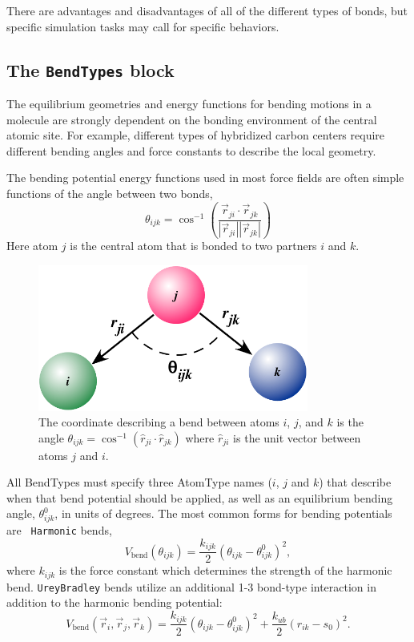 \documentclass[letterpaper]{report}
\begin{document}
There are advantages and disadvantages of all of the different types
of bonds, but specific simulation tasks may call for specific
behaviors.

\subsection{\label{section:ffBend}The {\tt BendTypes} block}
The equilibrium geometries and energy functions for bending motions in
a molecule are strongly dependent on the bonding environment of the
central atomic site.  For example, different types of hybridized
carbon centers require different bending angles and force constants to
describe the local geometry.

The bending potential energy functions used in most force fields are
often simple functions of the angle between two bonds,
\begin{equation}
\theta_{ijk} = \cos^{-1} \left(\frac{\vec{r}_{ji} \cdot
    \vec{r}_{jk}}{\left| \vec{r}_{ji} \right| \left| \vec{r}_{jk}
    \right|} \right)
\end{equation} 
Here atom $j$ is the central atom that is bonded to two partners $i$
and $k$.

\begin{figure}[h]
\centering
\includegraphics[width=3.5in]{bend.pdf}
\caption[Bend angle coordinates]{The coordinate describing a bend
  between atoms $i$, $j$, and $k$ is the angle $\theta_{ijk} =
  \cos^{-1} \left(\hat{r}_{ji} \cdot \hat{r}_{jk}\right)$ where $\hat{r}_{ji}$ is
  the unit vector between atoms $j$ and $i$. }
\label{fig:bend}
\end{figure}


All BendTypes must specify three AtomType names ($i$, $j$ and $k$)
that describe when that bend potential should be applied, as well as
an equilibrium bending angle, $\theta_{ijk}^0$, in units of
degrees. The most common forms for bending potentials are {\tt
  Harmonic} bends,
\begin{equation}
V_{\text{bend}}(\theta_{ijk}) = \frac{k_{ijk}}{2}( \theta_{ijk} - \theta_{ijk}^0
)^2, \label{eq:bendPot}
\end{equation}
where $k_{ijk}$ is the force constant which determines the strength of
the harmonic bend. {\tt UreyBradley} bends utilize an additional 1-3
bond-type interaction in addition to the harmonic bending potential:
\begin{equation}
V_{\text{bend}}(\vec{r}_i , \vec{r}_j, \vec{r}_k)
  =\frac{k_{ijk}}{2}( \theta_{ijk} - \theta_{ijk}^0)^2 
  + \frac{k_{ub}}{2}( r_{ik} - s_0 )^2. \label{eq:ubBend}
\end{equation}
\end{document}
